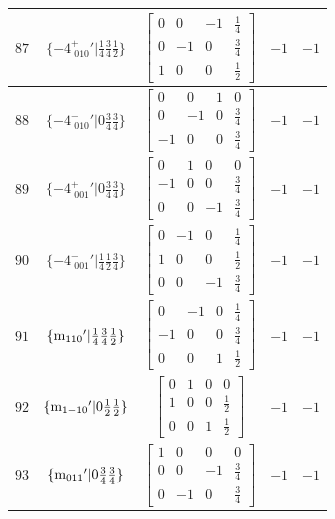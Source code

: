 \documentclass[fleqn,8pt]{jsarticle}
\begin{document}
\begin{longtable}{ccccc}
$ 87 $ & $ \{-4^{+}_{\,\,010}{}'|\frac{1}{4} \frac{3}{4} \frac{1}{2}\} $ & $ \begin{bmatrix} 0 & 0 & -1 & \frac{1}{4} \\ 0 & -1 & 0 & \frac{3}{4} \\ 1 & 0 & 0 & \frac{1}{2} \end{bmatrix} $ & $ -1 $ & $ -1 $ \\ \hline
$ 88 $ & $ \{-4^{-}_{\,\,010}{}'|0 \frac{3}{4} \frac{3}{4}\} $ & $ \begin{bmatrix} 0 & 0 & 1 & 0 \\ 0 & -1 & 0 & \frac{3}{4} \\ -1 & 0 & 0 & \frac{3}{4} \end{bmatrix} $ & $ -1 $ & $ -1 $ \\ \hline
$ 89 $ & $ \{-4^{+}_{\,\,001}{}'|0 \frac{3}{4} \frac{3}{4}\} $ & $ \begin{bmatrix} 0 & 1 & 0 & 0 \\ -1 & 0 & 0 & \frac{3}{4} \\ 0 & 0 & -1 & \frac{3}{4} \end{bmatrix} $ & $ -1 $ & $ -1 $ \\ \hline
$ 90 $ & $ \{-4^{-}_{\,\,001}{}'|\frac{1}{4} \frac{1}{2} \frac{3}{4}\} $ & $ \begin{bmatrix} 0 & -1 & 0 & \frac{1}{4} \\ 1 & 0 & 0 & \frac{1}{2} \\ 0 & 0 & -1 & \frac{3}{4} \end{bmatrix} $ & $ -1 $ & $ -1 $ \\ \hline
$ 91 $ & $ \{{\rm m}_{110}{}'|\frac{1}{4} \frac{3}{4} \frac{1}{2}\} $ & $ \begin{bmatrix} 0 & -1 & 0 & \frac{1}{4} \\ -1 & 0 & 0 & \frac{3}{4} \\ 0 & 0 & 1 & \frac{1}{2} \end{bmatrix} $ & $ -1 $ & $ -1 $ \\ \hline
$ 92 $ & $ \{{\rm m}_{1-10}{}'|0 \frac{1}{2} \frac{1}{2}\} $ & $ \begin{bmatrix} 0 & 1 & 0 & 0 \\ 1 & 0 & 0 & \frac{1}{2} \\ 0 & 0 & 1 & \frac{1}{2} \end{bmatrix} $ & $ -1 $ & $ -1 $ \\ \hline
$ 93 $ & $ \{{\rm m}_{011}{}'|0 \frac{3}{4} \frac{3}{4}\} $ & $ \begin{bmatrix} 1 & 0 & 0 & 0 \\ 0 & 0 & -1 & \frac{3}{4} \\ 0 & -1 & 0 & \frac{3}{4} \end{bmatrix} $ & $ -1 $ & $ -1 $ \\ \hline

\end{longtable}
\end{document}

